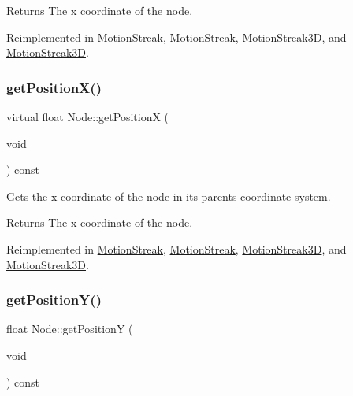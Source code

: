 \begin{DoxyReturn}{Returns}
The x coordinate of the node. 
\end{DoxyReturn}


Reimplemented in \hyperlink{classMotionStreak_a21adf0bcf7c0713e1e0b0b00c5256a37}{Motion\+Streak}, \hyperlink{classMotionStreak_a0a7f37b3a4e479cfed0dea79222ad1e6}{Motion\+Streak}, \hyperlink{classMotionStreak3D_a1cbae92f092d3fb20371a676de053d07}{Motion\+Streak3D}, and \hyperlink{classMotionStreak3D_a2dcc5baf8956d2fef986b564bc21ff5c}{Motion\+Streak3D}.

\mbox{\label{classNode_a39284a5629f41cc50054e538ab28f5ab}} 
\subsubsection{\texorpdfstring{get\+Position\+X()}{getPositionX()}\hspace{0.1cm}{\footnotesize\ttfamily [2/2]}}
{\footnotesize\ttfamily virtual float Node\+::get\+PositionX (\begin{DoxyParamCaption}\item[{void}]{ }\end{DoxyParamCaption}) const\hspace{0.3cm}{\ttfamily [virtual]}}

Gets the x coordinate of the node in its parent\textquotesingle{}s coordinate system.

\begin{DoxyReturn}{Returns}
The x coordinate of the node. 
\end{DoxyReturn}


Reimplemented in \hyperlink{classMotionStreak_a21adf0bcf7c0713e1e0b0b00c5256a37}{Motion\+Streak}, \hyperlink{classMotionStreak_a0a7f37b3a4e479cfed0dea79222ad1e6}{Motion\+Streak}, \hyperlink{classMotionStreak3D_a1cbae92f092d3fb20371a676de053d07}{Motion\+Streak3D}, and \hyperlink{classMotionStreak3D_a2dcc5baf8956d2fef986b564bc21ff5c}{Motion\+Streak3D}.

\mbox{\label{classNode_ae2ab411fb5477789b7b96477b18c0f83}} 
\subsubsection{\texorpdfstring{get\+Position\+Y()}{getPositionY()}\hspace{0.1cm}{\footnotesize\ttfamily [1/2]}}
{\footnotesize\ttfamily float Node\+::get\+PositionY (\begin{DoxyParamCaption}\item[{void}]{ }\end{DoxyParamCaption}) const\hspace{0.3cm}{\ttfamily [virtual]}}

